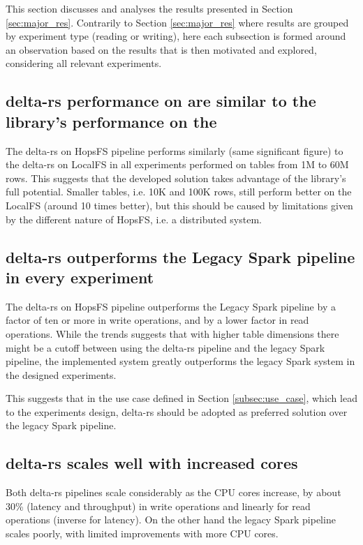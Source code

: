 This section discusses and analyses the results presented in Section \ref{sec:major_res}. Contrarily to Section \ref{sec:major_res} where results are grouped by experiment type (reading or writing), here each subsection is formed around an observation based on the results that is then motivated and explored, considering all relevant experiments.

\subsection{delta-rs performance on  are similar to the library's performance on the }

The delta-rs on \gls{HopsFS} pipeline performs similarly (same significant figure) to the delta-rs on \gls{LocalFS} in all experiments performed on tables from 1M to 60M rows. This suggests that the developed solution takes advantage of the library's full potential. Smaller tables, i.e. 10K and 100K rows, still perform better on the \gls{LocalFS} (around 10 times better), but this should be caused by limitations given by the different nature of \gls{HopsFS}, i.e. a distributed system.

\subsection{delta-rs outperforms the Legacy Spark pipeline in every experiment}

The delta-rs on \gls{HopsFS} pipeline outperforms the Legacy Spark pipeline by a factor of ten or more in write operations, and by a lower factor in read operations. While the trends suggests that with higher table dimensions there might be a cutoff between using the delta-rs pipeline and the legacy Spark pipeline, the implemented system greatly outperforms the legacy Spark system in the designed experiments. 

This suggests that in the use case defined in Section \ref{subsec:use_case}, which lead to the experiments design, delta-rs should be adopted as preferred solution over the legacy Spark pipeline.

\subsection{delta-rs scales well with increased  cores}

Both delta-rs pipelines scale considerably as the \gls{CPU} cores increase, by about 30\% (latency and throughput) in write operations and linearly for read operations (inverse for latency). On the other hand the legacy Spark pipeline scales poorly, with limited improvements with more \gls{CPU} cores. 


